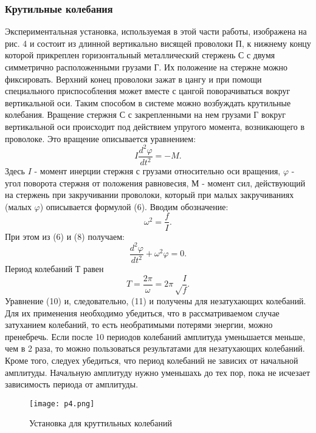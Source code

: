 \subsubsection{Крутильные колебания}
Экспериментальная установка, используемая в этой части работы,
изображена на рис. 4 и состоит из длинной вертикально висящей
проволоки П, к нижнему концу которой прикреплен
горизонтальный металлический стержень С с двумя симметрично
расположенными грузами Г. Их положение на стержне можно
фиксировать. Верхний конец проволоки зажат в цангу и при
помощи специального приспособления может вместе с цангой
поворачиваться вокруг вертикальной оси. Таким способом в
системе можно возбуждать крутильные колебания. Вращение
стержня С с закрепленными на нем грузами Г вокруг
вертикальной оси происходит под действием упругого момента,
возникающего в проволоке. Это вращение описывается уравнением:
\begin{equation}
    I\frac{d^2\varphi}{dt^2} = - M.
\end{equation}
Здесь $I$ - момент инерции стержня с грузами относительно оси
вращения, $\varphi$ - угол поворота стержня от положения
равновесия, М - момент сил, действующий на стержень при
закручивании проволоки, который при малых закручиваниях
(малых $\varphi$) описывается формулой (6).
Вводим обозначение:
\begin{equation}
    \omega^2 = \frac fI.
\end{equation}
При этом из (6) и (8) получаем:
\begin{equation}
    \frac{d^2\varphi}{dt^2} + \omega^2\varphi = 0.
\end{equation}
Период колебаний Т равен
\begin{equation}
    T = \frac{2\pi}{\omega} = 2\pi\sqrt\frac If.
\end{equation}
Уравнение (10) и, следовательно, (11) и получены для
незатухающих колебаний. Для их применения необходимо
убедиться, что в рассматриваемом случае затуханием колебаний,
то есть необратимыми потерями энергии, можно пренебречь. Если
после 10 периодов колебаний амплитуда уменьшается меньше, чем
в 2 раза, то можно пользоваться результатами для незатухающих
колебаний. Кроме того, следуех убедиться, что период
колебаний не зависих от начальной амплитуды. Начальную
амплитуду нужно уменьшахь до тех пор, пока не исчезает
зависимость периода от амплитуды.
\begin{figure}[H]
    \centering
\texttt{[image: p4.png]}
    \caption{Установка для круттильных колебаний}
    \label{fig:my_label}
\end{figure}
